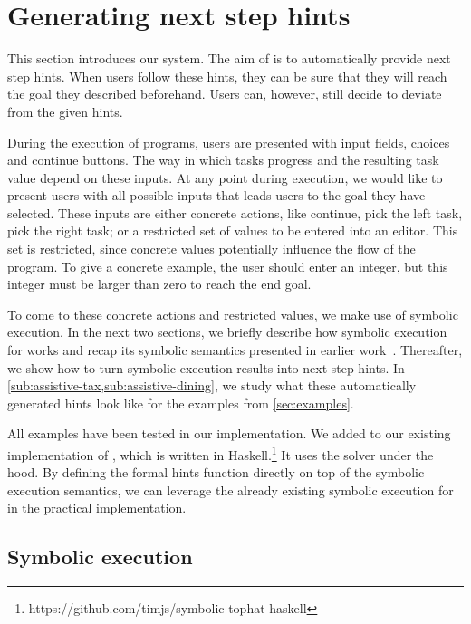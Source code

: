 
\section{Generating next step hints}
\label{sec:assistive}

This section introduces our \ASTOPHAT system.
The aim of \ASTOPHAT is to automatically provide next step hints.
When users follow these hints, they can be sure that they will reach the goal they described beforehand.
Users can, however, still decide to deviate from the given hints.

During the execution of \TOPHAT programs, users are presented with input fields, choices and continue buttons.
The way in which tasks progress and the resulting task value depend on these inputs.
At any point during execution, we would like to present users with all possible inputs that leads users to the goal they have selected.
These inputs are either concrete actions, like continue, pick the left task, pick the right task;
or a restricted set of values to be entered into an editor.
This set is restricted, since concrete values potentially influence the flow of the program.
To give a concrete example, the user should enter an integer, but this integer must be larger than zero to reach the end goal.

To come to these concrete actions and restricted values, we make use of symbolic execution.
In the next two sections, we briefly describe how symbolic execution for \TOPHAT works
and recap its symbolic semantics presented in earlier work~\cite{Naus2019}.
Thereafter, we show how to turn symbolic execution results into next step hints.
In \cref{sub:assistive-tax,sub:assistive-dining}, we study what these automatically generated hints look like for the examples from \cref{sec:examples}.

All examples have been tested in our implementation.
We added \ASTOPHAT to our existing implementation of \STOPHAT, which is written in Haskell.\footnote{https://github.com/timjs/symbolic-tophat-haskell}
It uses the \ZTHREE \SMT solver under the hood.
By defining the formal hints function directly on top of the symbolic execution semantics, %
we can leverage the already existing symbolic execution for \STOPHAT in the practical implementation.


\subsection{Symbolic execution}
\label{sub:symbolic-execution}

